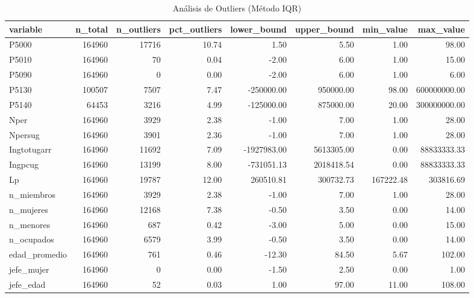 \begin{table}[ht]
\centering
\begin{tabular}{lrrrrrrr}
  \toprule
variable & n\_total & n\_outliers & pct\_outliers & lower\_bound & upper\_bound & min\_value & max\_value \\ 
  \midrule
P5000 & 164960 & 17716 & 10.74 & 1.50 & 5.50 & 1.00 & 98.00 \\ 
  P5010 & 164960 &  70 & 0.04 & -2.00 & 6.00 & 1.00 & 15.00 \\ 
  P5090 & 164960 &   0 & 0.00 & -2.00 & 6.00 & 1.00 & 6.00 \\ 
  P5130 & 100507 & 7507 & 7.47 & -250000.00 & 950000.00 & 98.00 & 600000000.00 \\ 
  P5140 & 64453 & 3216 & 4.99 & -125000.00 & 875000.00 & 20.00 & 300000000.00 \\ 
  Nper & 164960 & 3929 & 2.38 & -1.00 & 7.00 & 1.00 & 28.00 \\ 
  Npersug & 164960 & 3901 & 2.36 & -1.00 & 7.00 & 1.00 & 28.00 \\ 
  Ingtotugarr & 164960 & 11692 & 7.09 & -1927983.00 & 5613305.00 & 0.00 & 88833333.33 \\ 
  Ingpcug & 164960 & 13199 & 8.00 & -731051.13 & 2018418.54 & 0.00 & 88833333.33 \\ 
  Lp & 164960 & 19787 & 12.00 & 260510.81 & 300732.73 & 167222.48 & 303816.69 \\ 
  n\_miembros & 164960 & 3929 & 2.38 & -1.00 & 7.00 & 1.00 & 28.00 \\ 
  n\_mujeres & 164960 & 12168 & 7.38 & -0.50 & 3.50 & 0.00 & 14.00 \\ 
  n\_menores & 164960 & 687 & 0.42 & -3.00 & 5.00 & 0.00 & 15.00 \\ 
  n\_ocupados & 164960 & 6579 & 3.99 & -0.50 & 3.50 & 0.00 & 14.00 \\ 
  edad\_promedio & 164960 & 761 & 0.46 & -12.30 & 84.50 & 5.67 & 102.00 \\ 
  jefe\_mujer & 164960 &   0 & 0.00 & -1.50 & 2.50 & 0.00 & 1.00 \\ 
  jefe\_edad & 164960 &  52 & 0.03 & 1.00 & 97.00 & 11.00 & 108.00 \\ 
   \bottomrule
\end{tabular}
\caption{Análisis de Outliers (Método IQR)} 
\label{tab:outliers}
\end{table}
